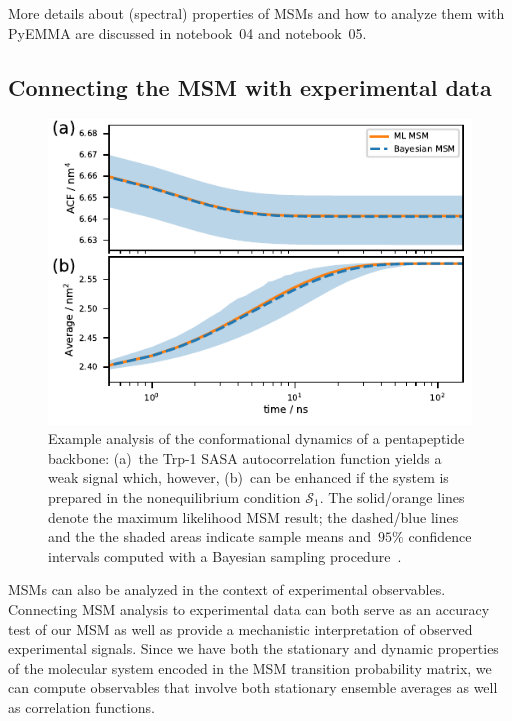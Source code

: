 \documentclass[9pt,tutorial]{livecoms}
\begin{document}
More details about (spectral) properties of MSMs and how to analyze them with PyEMMA are discussed in notebook~04 and notebook~05.

\subsection{Connecting the MSM with experimental data}

\begin{figure}
\includegraphics{figure_7}
\caption{Example analysis of the conformational dynamics of a pentapeptide backbone:
(a)~the Trp-1 SASA autocorrelation function yields a weak signal which, however,
(b)~can be enhanced if the system is prepared in the nonequilibrium condition $\mathcal{S}_1$.
The solid/orange lines denote the maximum likelihood MSM result;
the dashed/blue lines and the the shaded areas indicate sample means and~$95\%$ confidence intervals computed with a Bayesian sampling procedure~\cite{ben-rev-msm}.}
\label{fig:msm-exp-obs}
\end{figure}

MSMs can also be analyzed in the context of experimental observables.
Connecting MSM analysis to experimental data can both serve as an accuracy test of our MSM as well as provide a mechanistic interpretation of observed experimental signals.
Since we have both the stationary and dynamic properties of the molecular system encoded in the MSM transition probability matrix,
we can compute observables that involve both stationary ensemble averages as well as correlation functions.
\end{document}
